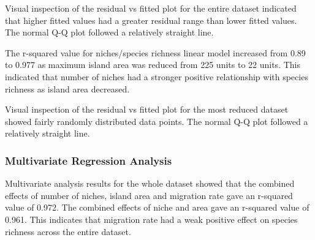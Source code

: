 \documentclass{article}
\begin{document}
Visual inspection of the residual vs fitted plot for the entire dataset indicated that higher fitted values had a greater residual range than lower fitted values. The normal Q-Q plot followed a relatively straight line. \bigskip

The r-squared value for niches/species richness linear model increased from 0.89 to 0.977 as maximum island area was reduced from 225 units to 22 units. This indicated that number of niches had a stronger positive relationship with species richness as island area decreased. \bigskip

Visual inspection of the residual vs fitted plot for the most reduced dataset showed fairly randomly distributed data points. The normal Q-Q plot followed a relatively straight line.  \bigskip

\subsubsection{Multivariate Regression Analysis}
Multivariate analysis results for the whole dataset showed that the combined effects of number of niches, island area and migration rate gave an r-squared value of 0.972. The combined effects of niche and area gave an r-squared value of 0.961. This indicates that migration rate had a weak positive effect on species richness across the entire dataset.  \bigskip
\end{document}
